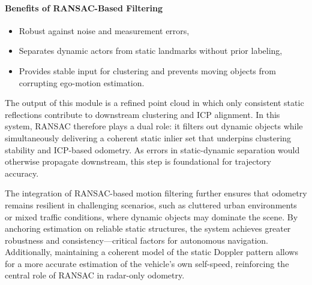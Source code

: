 \vspace{1cm}
\paragraph*{Benefits of RANSAC-Based Filtering}
\begin{itemize}
    \item Robust against noise and measurement errors,
    \item Separates dynamic actors from static landmarks without prior labeling,
    \item Provides stable input for clustering and prevents moving objects from corrupting ego-motion estimation.
\end{itemize}

The output of this module is a refined point cloud in which only consistent static reflections contribute to downstream clustering and ICP alignment. 
In this system, RANSAC therefore plays a dual role: it filters out dynamic objects while simultaneously delivering a coherent static inlier set that underpins clustering stability and ICP-based odometry. 
As errors in static-dynamic separation would otherwise propagate downstream, this step is foundational for trajectory accuracy.


The integration of RANSAC-based motion filtering further ensures that odometry remains resilient in challenging scenarios, such as cluttered urban environments or mixed traffic conditions, where dynamic objects may dominate the scene. 
By anchoring estimation on reliable static structures, the system achieves greater robustness and consistency—critical factors for autonomous navigation. 
Additionally, maintaining a coherent model of the static Doppler pattern allows for a more accurate estimation of the vehicle's own self-speed, reinforcing the central role of RANSAC in radar-only odometry.
